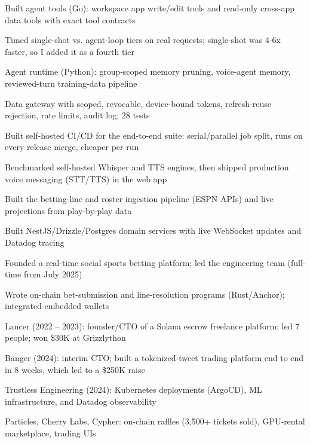 \documentclass[print]{jack-resume}
\begin{document}
\begin{tightemize}
    \item Built agent tools (Go): workspace app write/edit tools and read-only cross-app data tools with exact tool contracts
    \item Timed single-shot vs. agent-loop tiers on real requests; single-shot was 4-6x faster, so I added it as a fourth tier
    \item Agent runtime (Python): group-scoped memory pruning, voice-agent memory, reviewed-turn training-data pipeline
    \item Data gateway with scoped, revocable, device-bound tokens, refresh-reuse rejection, rate limits, audit log; 28 tests
    \item Built self-hosted CI/CD for the end-to-end suite: serial/parallel job split, runs on every release merge, cheaper per run
    \item Benchmarked self-hosted Whisper and TTS engines, then shipped production voice messaging (STT/TTS) in the web app
\end{tightemize}
\sectionsep

\begin{tightemize}
    \item Built the betting-line and roster ingestion pipeline (ESPN APIs) and live projections from play-by-play data
    \item Built NestJS/Drizzle/Postgres domain services with live WebSocket updates and Datadog tracing
    \item Founded a real-time social sports betting platform; led the engineering team (full-time from July 2025)
    \item Wrote on-chain bet-submission and line-resolution programs (Rust/Anchor); integrated embedded wallets
\end{tightemize}
\sectionsep

\begin{tightemize}
    \item Lancer (2022 – 2023): founder/CTO of a Solana escrow freelance platform; led 7 people; won \$30K at Grizzlython
    \item Banger (2024): interim CTO; built a tokenized-tweet trading platform end to end in 8 weeks, which led to a \$250K raise
    \item Trustless Engineering (2024): Kubernetes deployments (ArgoCD), ML infrastructure, and Datadog observability
    \item Particles, Cherry Labs, Cypher: on-chain raffles (3,500+ tickets sold), GPU-rental marketplace, trading UIs
\end{tightemize}
\sectionsep
\end{document}
